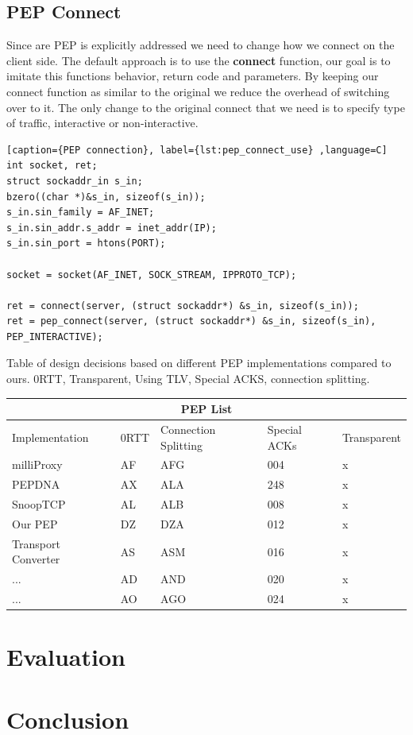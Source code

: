 \documentclass[a4paper,english, 11pt]{report}
\begin{document}
\section{PEP Connect}
Since are PEP is explicitly addressed we need to change how we connect on the client side.
The default approach is to use the \textbf{connect} function, our goal is to imitate this functions behavior, return code and parameters. By keeping our connect function as similar to the original we reduce the overhead of switching over to it. The only change to the original connect that we need is to specify type of traffic, interactive or non-interactive.
\begin{lstlisting}[caption={PEP connection}, label={lst:pep_connect_use} ,language=C]
int socket, ret;
struct sockaddr_in s_in;
bzero((char *)&s_in, sizeof(s_in));
s_in.sin_family = AF_INET;
s_in.sin_addr.s_addr = inet_addr(IP);
s_in.sin_port = htons(PORT);

socket = socket(AF_INET, SOCK_STREAM, IPPROTO_TCP);

ret = connect(server, (struct sockaddr*) &s_in, sizeof(s_in));
ret = pep_connect(server, (struct sockaddr*) &s_in, sizeof(s_in), PEP_INTERACTIVE);
\end{lstlisting}




{Table of design decisions based on different PEP implementations compared to ours.}
{0RTT, Transparent, Using TLV, Special ACKS, connection splitting.}\\
\begin{tabular}{ |p{4cm}||p{2cm}|p{2cm}|p{2cm}|p{2cm}| }
 \hline
 \multicolumn{5}{|c|}{PEP List} \\
 \hline
 Implementation& 0RTT &Connection Splitting &Special ACKs &Transparent\\
 \hline
 milliProxy   & AF    &AFG&   004 & x\\
 PEPDNA&   AX  & ALA   &248 & x\\
 SnoopTCP &AL & ALB&  008 & x\\
 Our PEP    &DZ & DZA&  012& x \\
 Transport Converter &   AS  & ASM&016& x\\
 ...& AD  & AND   &020& x\\
 ...& AO  & AGO&024& x\\
 \hline
\end{tabular}

\chapter{Evaluation}
\chapter{Conclusion}

{}

\end{document}
